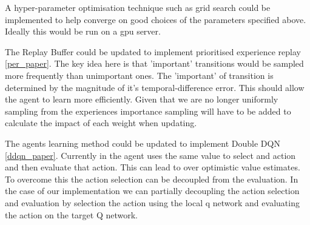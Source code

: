 \documentclass[12pt]{article}
\begin{document}
A hyper-parameter optimisation technique such as grid search could be implemented to help converge on good choices of the parameters 
specified above. Ideally this would be run on a gpu server.

The Replay Buffer could be updated to implement prioritised experience replay \ref{per_paper}. 
The key idea here is that 'important' transitions would be sampled more frequently than unimportant ones. 
The 'important' of transition is determined by the magnitude of it's temporal-difference error.
This should allow the agent to learn more efficiently. 
Given that we are no longer uniformly sampling from the experiences importance sampling will have to be added to calculate the impact of each weight when updating.

The agents learning method could be updated to implement Double DQN \ref{ddqn_paper}. 
Currently in the agent uses the same value to select and action and then evaluate that action.
This can lead to over optimistic value estimates.
To overcome this the action selection can be decoupled from the evaluation.
In the case of our implementation we can partially decoupling the action selection and evaluation by selection the action using the local q network and evaluating the action on the target Q network.
\end{document}
